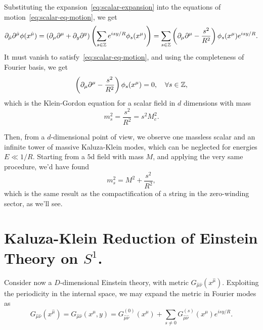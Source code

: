 Substituting the expansion~\eqref{eq:scalar-expansion} into the equations of motion~\eqref{eq:scalar-eq-motion}, we get
\begin{equation*}
       \partial_{\hat{\mu}} \partial^{\hat{\mu}} \phi(x^{\hat{\mu}}) = \left( \partial_\mu \partial^\mu + \partial_y \partial^y \right) \left( \sum_{s \in \mathbb{Z}} e^{isy/R} \phi_s(x^\mu) \right)
       = \sum_{s \in\mathbb{Z}} \left( \partial_\mu \partial^\mu - \frac{s^2}{R^2} \right)\phi_s(x^\mu) e^{isy/R}.
\end{equation*}
It must vanish to satisfy~\eqref{eq:scalar-eq-motion}, and using the completeness of Fourier basis, we get
\begin{equation}
    \left( \partial_\mu \partial^\mu - \frac{s^2}{R^2} \right) \phi_s(x^\mu) = 0, \quad \forall s \in \mathbb{Z},
\end{equation}
which is the Klein-Gordon equation for a scalar field in $d$ dimensions with mass
\begin{equation}
    m^2_s = \frac{s^2}{R^2} = s^2 M_c^2.
\end{equation}

Then, from a $d$-dimensional point of view, we observe one massless scalar and an infinite tower of massive Kaluza-Klein modes, which can be neglected for energies $E \ll 1/R$. Starting from a $5$d field with mass $M$, and applying the very same procedure, we'd have found
\begin{equation}\label{eq:usual-KK-masses}
    m^2_s = M^2 + \frac{s^2}{R^2} ,
\end{equation}
which is the same result as the compactification of a string in the zero-winding sector, as we'll see.

\section{Kaluza-Klein Reduction of Einstein Theory on \texorpdfstring{$S^1$}{S1}.}
Consider now a $D$-dimensional Einstein theory, with metric $G_{\hat{\mu} \hat{\nu}} (x^{\hat{\mu}})$. Exploiting the periodicity in the internal space, we may expand the metric in Fourier modes as
\begin{equation}
    G_{\hat{\mu} \hat{\nu}} (x^{\hat{\mu}}) = G_{\hat{\mu} \hat{\nu}} (x^\mu, y) = G^{(0)}_{\hat{\mu} \hat{\nu}} (x^\mu)+ \sum_{s \neq 0} G^{(s)}_{\hat{\mu} \hat{\nu}} (x^\mu) e^{i s y / R}.
\end{equation}


